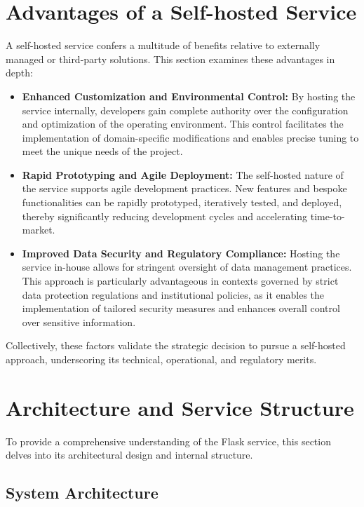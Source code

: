 \section{Advantages of a Self-hosted Service}
A self-hosted service confers a multitude of benefits relative to externally managed or third-party solutions. This section examines these advantages in depth:
\begin{itemize}
    \item \textbf{Enhanced Customization and Environmental Control:} By hosting the service internally, developers gain complete authority over the configuration and optimization of the operating environment. This control facilitates the implementation of domain-specific modifications and enables precise tuning to meet the unique needs of the project.
    \item \textbf{Rapid Prototyping and Agile Deployment:} The self-hosted nature of the service supports agile development practices. New features and bespoke functionalities can be rapidly prototyped, iteratively tested, and deployed, thereby significantly reducing development cycles and accelerating time-to-market.
    \item \textbf{Improved Data Security and Regulatory Compliance:} Hosting the service in-house allows for stringent oversight of data management practices. This approach is particularly advantageous in contexts governed by strict data protection regulations and institutional policies, as it enables the implementation of tailored security measures and enhances overall control over sensitive information.
\end{itemize}
Collectively, these factors validate the strategic decision to pursue a self-hosted approach, underscoring its technical, operational, and regulatory merits.


\section{Architecture and Service Structure}

To provide a comprehensive understanding of the Flask service, this section delves into its architectural design and internal structure.

\subsection{System Architecture}

